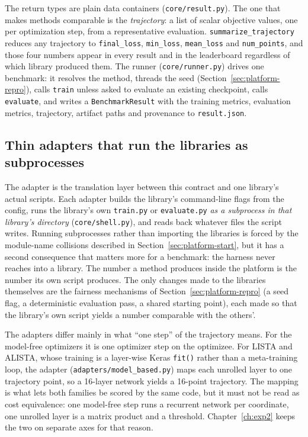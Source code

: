 The return types are plain data containers (\texttt{core/result.py}). The
one that makes methods comparable is the \emph{trajectory}: a list of scalar
objective values, one per optimization step, from a representative
evaluation. \texttt{summarize\_trajectory} reduces any trajectory to
\texttt{final\_loss}, \texttt{min\_loss}, \texttt{mean\_loss} and
\texttt{num\_points}, and those four numbers appear in every result and in
the leaderboard regardless of which library produced them. The runner
(\texttt{core/runner.py}) drives one benchmark: it resolves the method,
threads the seed (Section~\ref{sec:platform-repro}), calls \texttt{train}
unless asked to evaluate an existing checkpoint, calls \texttt{evaluate},
and writes a \texttt{BenchmarkResult} with the training metrics, evaluation
metrics, trajectory, artifact paths and provenance to \texttt{result.json}.

\subsection{Thin adapters that run the libraries as subprocesses}

The adapter is the translation layer between this contract and one library's
actual scripts. Each adapter builds the library's command-line flags from the
config, runs the library's own \texttt{train.py} or \texttt{evaluate.py}
\emph{as a subprocess in that library's directory}
(\texttt{core/shell.py}), and reads back whatever files the script writes.
Running subprocesses rather than importing the libraries is forced by the
module-name collisions described in Section~\ref{sec:platform-start}, but it
has a second consequence that matters more for a benchmark: the harness never
reaches into a library. The number a method produces inside the platform is
the number its own script produces. The only changes made to the libraries
themselves are the fairness mechanisms of Section~\ref{sec:platform-repro}
(a seed flag, a deterministic evaluation pass, a shared starting point), each
made so that the library's own script yields a number comparable with the
others'.

The adapters differ mainly in what ``one step'' of the trajectory means. For
the model-free optimizers it is one optimizer step on the optimizee. For
LISTA and ALISTA, whose training is a layer-wise Keras \texttt{fit()} rather
than a meta-training loop, the adapter (\texttt{adapters/model\_based.py})
maps each unrolled layer to one trajectory point, so a 16-layer network yields
a 16-point trajectory. The mapping is what lets both families be scored by
the same code, but it must not be read as cost equivalence: one model-free
step runs a recurrent network per coordinate, one unrolled layer is a matrix
product and a threshold. Chapter~\ref{ch:exp2} keeps the two on separate
axes for that reason.

